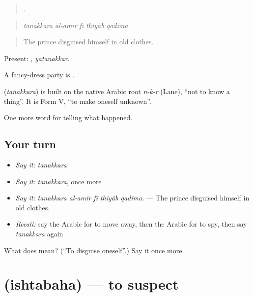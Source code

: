 \begin{quote}
    .
\end{quote}

\begin{quote}
\emph{tanakkara al-amīr fī thiyāb qadīma.}
\end{quote}

\begin{quote}
The prince disguised himself in old clothes.
\end{quote}

Present: , \emph{yatanakkar}.

A fancy-dress party is  .

\begin{cousinweb}
\textbf{} (\emph{tanakkara}) is built on the native Arabic root \emph{n-k-r} (Lane), \textquotedblleft{}not to know a thing\textquotedblright{}. It is Form V, \textquotedblleft{}to make oneself unknown\textquotedblright{}.
\end{cousinweb}

\begin{grammarlens}[title={What you've built}]
One more word for telling what happened.
\end{grammarlens}

\subsection*{Your turn}
\begin{itemize}
\raggedright
  \item \emph{Say it:} \emph{tanakkara}
  \item \emph{Say it:} \emph{tanakkara}, once more
  \item \emph{Say it:} \emph{tanakkara al-amīr fī thiyāb qadīma.} — The prince disguised himself in old clothes.
  \item \emph{Recall:} say the Arabic for to move away, then the Arabic for to spy, then say \emph{tanakkara} again
\end{itemize}

\begin{tcolorbox}[breakable,colback=teal!4,colframe=teal!35!black,title={Before you move on}]
What does  mean? (\textquotedblleft{}To disguise oneself\textquotedblright{}.) Say it once more.
\end{tcolorbox}
\section[\texorpdfstring{\ar{اشتبه} (ishtabaha)}{اشتبه (ishtabaha)}]{ (ishtabaha) — to suspect}

